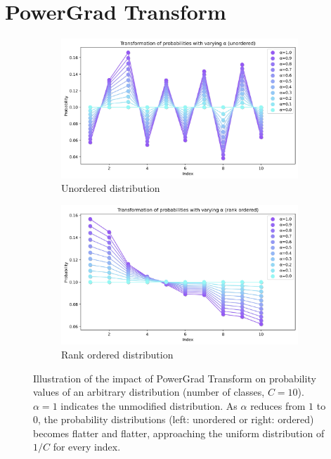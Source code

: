 \documentclass[runningheads]{llncs}
\begin{document}
\section{PowerGrad Transform}
\label{sec:Powe}


\begin{figure}[t]
\centering
\begin{subfigure}{.5\textwidth}
\centering
\includegraphics[width=0.98\textwidth]{prob_transform_unordered}
\caption{Unordered distribution}
\end{subfigure}%
\begin{subfigure}{.5\textwidth}
\centering
\includegraphics[width=0.98\textwidth]{prob_transform_ordered}
\caption{Rank ordered distribution}
\end{subfigure}
\caption{ Illustration of the impact of PowerGrad Transform on probability values of an
arbitrary distribution (number of classes, $C=10$). $\alpha=1$ indicates the unmodified
distribution. As $\alpha$ reduces from $1$ to $0$, the probability distributions (left:
unordered or right: ordered) becomes flatter and flatter, approaching the uniform
distribution of $1/C$ for every index. }
\label{fig:prob_plots}
\vspace{-0.5cm}
\end{figure}
\end{document}
